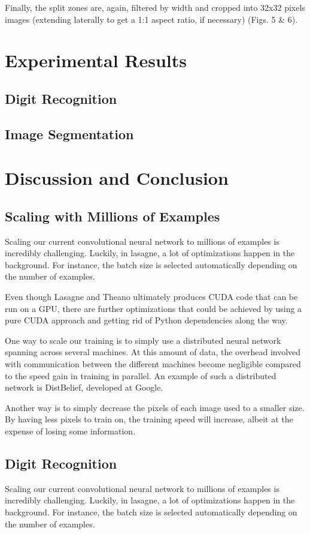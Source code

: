 \documentclass{article} %
\begin{document}
Finally, the split zones are, again, filtered by width and cropped into 32x32 pixels images (extending laterally to get a 1:1 aspect ratio, if necessary) (Figs. 5 \& 6).


\section{Experimental Results}
\subsection{Digit Recognition}
\subsection{Image Segmentation}

\section{Discussion and Conclusion}
\subsection{Scaling with Millions of Examples}
Scaling our current convolutional neural network to millions of examples is incredibly challenging. Luckily, in lasagne, a lot of optimizations happen in the background. For instance, the batch size is selected automatically depending on the number of examples.

Even though Lasagne and Theano ultimately produces CUDA code that can be run on a GPU, there are further optimizations that could be achieved by using a pure CUDA approach and getting rid of Python dependencies along the way. 

One way to scale our training is to simply use a distributed neural network spanning across several machines. At this amount of data, the overhead involved with communication between the different machines become negligible compared to the speed gain in training in parallel. An example of such a distributed network is DistBelief, developed at Google.

Another way is to simply decrease the pixels of each image used to a smaller size. By having less pixels to train on, the training speed will increase, albeit at the expense of losing some information.

\subsection{Digit Recognition}
Scaling our current convolutional neural network to millions of examples is incredibly challenging. Luckily, in lasagne, a lot of optimizations happen in the background. For instance, the batch size is selected automatically depending on the number of examples.
\end{document}
